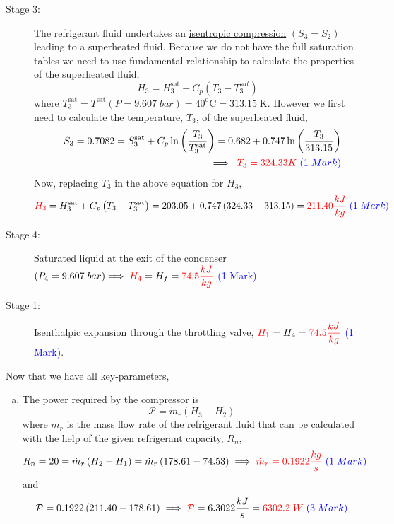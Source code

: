\documentclass[12pt,twoside]{report}
\newcommand{\frc}{\displaystyle\frac}
\begin{document}
\begin{description}
\begin{description}
%
\item [Stage 3:] The refrigerant fluid undertakes an \underline{isentropic compression} $\left(S_{3}=S_{2}\right)$ leading to a superheated fluid. Because we do not have the full saturation tables we need to use fundamental relationship to calculate the properties of the superheated fluid,
\begin{displaymath}
H_{3} = H_{3}^{\text{sat}}+C_{p}\left(T_{3}-T_{3}^{sat}\right)
\end{displaymath} 
where $T_{3}^{\text{sat}}=T^{\text{sat}}\left(P=9.607\;bar\right)=40^{\text{o}}\text{C}=313.15\;\text{K}$. However we first need to calculate the temperature, $T_{3}$, of the superheated fluid,
\begin{eqnarray}
&&S_{3} = 0.7082 = S_{3}^{\text{sat}} + C_{p}\ln\left(\frc{T_{3}}{T_{3}^{\text{sat}}}\right) = 0.682 + 0.747 \ln\left(\frc{T_{3}}{313.15}\right) \nonumber \\
&&\Longrightarrow \;\; \textcolor{red}{T_{3}= 324.33 K} \;\textcolor{blue}{(1\; Mark)} \nonumber
\end{eqnarray}
Now, replacing $T_{3}$ in the above equation for $H_{3}$,
\begin{displaymath}
\textcolor{red}{H_{3}}=H_{3}^{\text{sat}}+C_{p}\left(T_{3}-T_{3}^{\text{sat}}\right)=203.05+0.747\left(324.33-313.15\right)=\textcolor{red}{211.40\frc{kJ}{kg}}\;\textcolor{blue}{(1\; Mark)}
\end{displaymath}
%
\item [Stage 4:] Saturated liquid at the exit of the condenser $\left(P_{4}=9.607\; bar\right) \Longrightarrow\; \textcolor{red}{H_{4}}=H_{f}=\textcolor{red}{74.5\frc{kJ}{kg}}$ \textcolor{blue}{(1\; Mark)}. 

%
\item [Stage 1:] Isenthalpic expansion through the throttling valve, $\textcolor{red}{H_{1}}=H_{4}=\textcolor{red}{74.5\frc{kJ}{kg}}$ \textcolor{blue}{(1\; Mark)}. 
%
\end{description}
Now that we have all key-parameters, 

\begin{enumerate}[(a)]
\item The power required by the compressor is
\begin{displaymath}
\mathcal{P}=\dot{m}_{r}\left(H_{3}-H_{2}\right)
\end{displaymath}
where $\dot{m}_{r}$ is the mass flow rate of the refrigerant fluid that can be calculated with the help of the given refrigerant capacity, $R_{n}$,
\begin{eqnarray}
R_{n} = 20 = \dot{m}_{r}\left(H_{2}-H_{1}\right) =  \dot{m}_{r}\left(178.61-74.53\right) \; \Longrightarrow \; \textcolor{red}{\dot{m}_{r}=0.1922\frc{kg}{s}}\;\textcolor{blue}{(1\; Mark)} \nonumber
\end{eqnarray}
and 
\begin{displaymath}
\mathcal{P}=0.1922\left(211.40-178.61\right)\; \Longrightarrow \; \textcolor{red}{\mathcal{P}}= 6.3022\frc{kJ}{s}=\textcolor{red}{6302.2\;W}\;\textcolor{blue}{(3\; Mark)}
\end{displaymath}


\end{enumerate}
\end{description}
\end{document}
